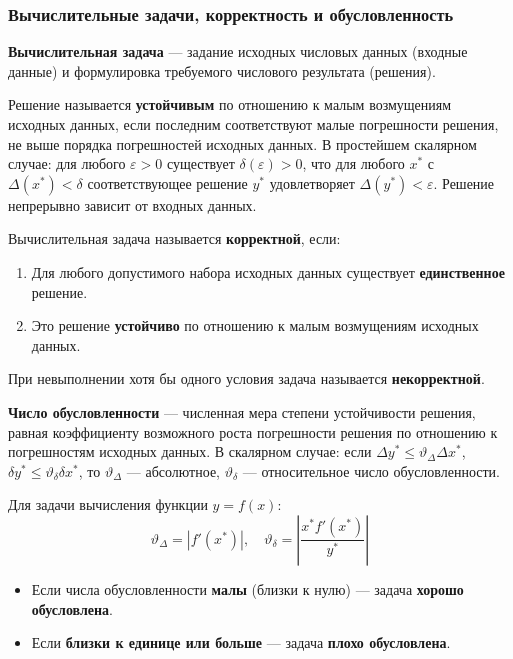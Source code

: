 \documentclass[14pt,a4paper]{extarticle}
\begin{document}
\subsubsection{Вычислительные задачи, корректность и обусловленность}

\textbf{Вычислительная задача} --- задание исходных числовых данных (входные данные) и формулировка требуемого числового результата (решения).

Решение называется \textbf{устойчивым} по отношению к малым возмущениям исходных данных, если последним соответствуют малые погрешности решения, не выше порядка погрешностей исходных данных. В простейшем скалярном случае: для любого $\varepsilon > 0$ существует $\delta(\varepsilon) > 0$, что для любого $x^*$ с $\Delta(x^*) < \delta$ соответствующее решение $y^*$ удовлетворяет $\Delta(y^*) < \varepsilon$. Решение непрерывно зависит от входных данных.

Вычислительная задача называется \textbf{корректной}, если:
\begin{enumerate}
    \item Для любого допустимого набора исходных данных существует \textbf{единственное} решение.
    \item Это решение \textbf{устойчиво} по отношению к малым возмущениям исходных данных.
\end{enumerate}

При невыполнении хотя бы одного условия задача называется \textbf{некорректной}.

\textbf{Число обусловленности} --- численная мера степени устойчивости решения, равная коэффициенту возможного роста погрешности решения по отношению к погрешностям исходных данных. В скалярном случае: если $\Delta y^* \leq \vartheta_\Delta \Delta x^*$, $\delta y^* \leq \vartheta_\delta \delta x^*$, то $\vartheta_\Delta$ --- абсолютное, $\vartheta_\delta$ --- относительное число обусловленности.

Для задачи вычисления функции $y = f(x)$:
\[\vartheta_\Delta = |f'(x^*)|, \quad \vartheta_\delta = \left|\frac{x^* f'(x^*)}{y^*}\right|\]

\begin{itemize}
    \item Если числа обусловленности \textbf{малы} (близки к нулю) --- задача \textbf{хорошо обусловлена}.
    \item Если \textbf{близки к единице или больше} --- задача \textbf{плохо обусловлена}.
\end{itemize}
\end{document}

